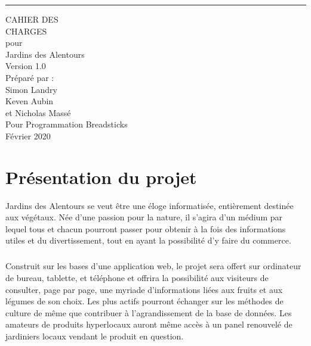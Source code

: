 \documentclass{scrreprt}
\def\myversion{1.0}
\def\projectname{Jardins des Alentours}
\begin{document}
\begin{flushright}
 \rule{16cm}{5pt}\vskip1cm
 \begin{bfseries}
  \Huge{CAHIER DES \\ CHARGES}\\
  \vspace{1.5cm}
  pour\\
  \vspace{1.5cm}
  \projectname\\
  \vspace{1.5cm}
  \LARGE{Version \myversion}\\
  \vspace{1.5cm}
  Préparé par :\\
  Simon Landry\\
  Keven Aubin\\
  et Nicholas Massé\\
  \vspace{1cm}
  Pour Programmation Breadsticks\\
  \vspace{.5cm}
  Février 2020\\
 \end{bfseries}
\end{flushright}
\newpage
{}
\tableofcontents
\newpage
{}
\chapter{Présentation du projet}

\projectname{} se veut être une éloge informatisée, entièrement destinée aux végétaux.
Née d'une passion pour la nature, il s'agira d'un médium par lequel tous et chacun
pourront passer pour obtenir à la fois des informations utiles et du divertissement, tout
en ayant la possibilité d'y faire du commerce.

\paragraph{}
Construit sur les bases d'une application web, le projet sera offert sur ordinateur de bureau, tablette, et téléphone
et offrira la possibilité aux visiteurs de consulter, page par page, une myriade d'informations
liées aux fruits et aux légumes de son choix. Les plus actifs pourront échanger sur les méthodes de culture de même que contribuer à l'agrandissement de la base de données.
Les amateurs de produits hyperlocaux auront même accès à un panel renouvelé de jardiniers locaux
vendant le produit en question.
\end{document}
